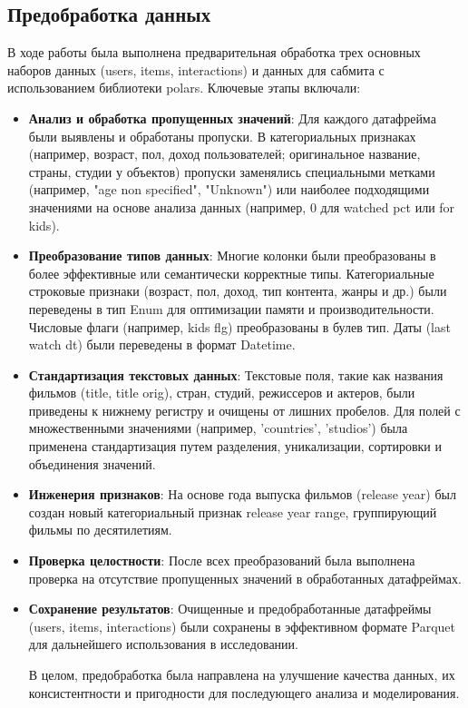 \subsection*{Предобработка данных}
В ходе работы была выполнена предварительная обработка трех основных наборов данных (users, items, interactions) и данных для сабмита с использованием библиотеки polars. Ключевые этапы включали:
\begin{itemize}
    \item \textbf{Анализ и обработка пропущенных значений}: 
    Для каждого датафрейма были выявлены и обработаны пропуски. В категориальных признаках (например, возраст, пол, доход пользователей; оригинальное название, страны, студии у объектов) пропуски заменялись специальными метками (например, "age non specified", "Unknown") или наиболее подходящими значениями на основе анализа данных (например, 0 для watched pct или for kids).
    \item \textbf{Преобразование типов данных}:
    Многие колонки были преобразованы в более эффективные или семантически корректные типы. Категориальные строковые признаки (возраст, пол, доход, тип контента, жанры и др.) были переведены в тип Enum для оптимизации памяти и производительности. Числовые флаги (например, kids flg) преобразованы в булев тип. Даты (last watch dt) были переведены в формат Datetime.
    \item \textbf{Стандартизация текстовых данных}:
    Текстовые поля, такие как названия фильмов (title, title orig), стран, студий, режиссеров и актеров, были приведены к нижнему регистру и очищены от лишних пробелов. Для полей с множественными значениями (например, 'countries', 'studios') была применена стандартизация путем разделения, уникализации, сортировки и объединения значений.
    \item \textbf{Инженерия признаков}:
    На основе года выпуска фильмов (release year) был создан новый категориальный признак release year range, группирующий фильмы по десятилетиям.
    \item  \textbf{Проверка целостности}:
    После всех преобразований была выполнена проверка на отсутствие пропущенных значений в обработанных датафреймах.
    \item  \textbf{Сохранение результатов}:
    Очищенные и предобработанные датафреймы (users, items, interactions) были сохранены в эффективном формате Parquet для дальнейшего использования в исследовании.

    В целом, предобработка была направлена на улучшение качества данных, их консистентности и пригодности для последующего анализа и моделирования.
\end{itemize}


